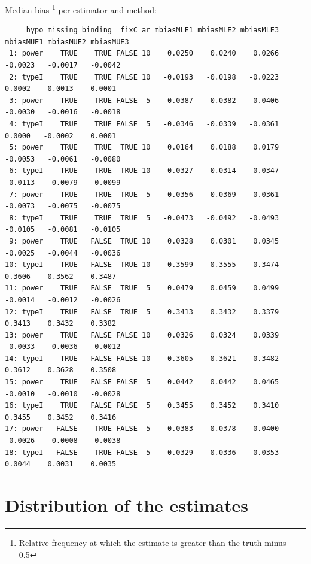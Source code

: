 \documentclass[12pt]{article}
\begin{document}
Median bias \footnote{Relative frequency at which the estimate is greater than the truth minus 0.5} per estimator and method:
\begin{adjustwidth}{-1cm}{-1cm}
\begin{verbatim}
     hypo missing binding  fixC ar mbiasMLE1 mbiasMLE2 mbiasMLE3 mbiasMUE1 mbiasMUE2 mbiasMUE3
 1: power    TRUE    TRUE FALSE 10    0.0250    0.0240    0.0266   -0.0023   -0.0017   -0.0042
 2: typeI    TRUE    TRUE FALSE 10   -0.0193   -0.0198   -0.0223    0.0002   -0.0013    0.0001
 3: power    TRUE    TRUE FALSE  5    0.0387    0.0382    0.0406   -0.0030   -0.0016   -0.0018
 4: typeI    TRUE    TRUE FALSE  5   -0.0346   -0.0339   -0.0361    0.0000   -0.0002    0.0001
 5: power    TRUE    TRUE  TRUE 10    0.0164    0.0188    0.0179   -0.0053   -0.0061   -0.0080
 6: typeI    TRUE    TRUE  TRUE 10   -0.0327   -0.0314   -0.0347   -0.0113   -0.0079   -0.0099
 7: power    TRUE    TRUE  TRUE  5    0.0356    0.0369    0.0361   -0.0073   -0.0075   -0.0075
 8: typeI    TRUE    TRUE  TRUE  5   -0.0473   -0.0492   -0.0493   -0.0105   -0.0081   -0.0105
 9: power    TRUE   FALSE  TRUE 10    0.0328    0.0301    0.0345   -0.0025   -0.0044   -0.0036
10: typeI    TRUE   FALSE  TRUE 10    0.3599    0.3555    0.3474    0.3606    0.3562    0.3487
11: power    TRUE   FALSE  TRUE  5    0.0479    0.0459    0.0499   -0.0014   -0.0012   -0.0026
12: typeI    TRUE   FALSE  TRUE  5    0.3413    0.3432    0.3379    0.3413    0.3432    0.3382
13: power    TRUE   FALSE FALSE 10    0.0326    0.0324    0.0339   -0.0033   -0.0036    0.0012
14: typeI    TRUE   FALSE FALSE 10    0.3605    0.3621    0.3482    0.3612    0.3628    0.3508
15: power    TRUE   FALSE FALSE  5    0.0442    0.0442    0.0465   -0.0010   -0.0010   -0.0028
16: typeI    TRUE   FALSE FALSE  5    0.3455    0.3452    0.3410    0.3455    0.3452    0.3416
17: power   FALSE    TRUE FALSE  5    0.0383    0.0378    0.0400   -0.0026   -0.0008   -0.0038
18: typeI   FALSE    TRUE FALSE  5   -0.0329   -0.0336   -0.0353    0.0044    0.0031    0.0035
\end{verbatim}

\end{adjustwidth}

\clearpage

\section{Distribution of the estimates}
\label{sec:org0a985ba}
\end{document}
